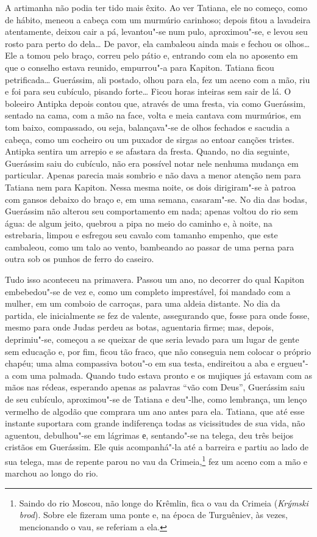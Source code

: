 A artimanha não podia ter tido mais êxito. Ao ver Tatiana, ele no
começo, como de hábito, meneou a cabeça com um murmúrio carinhoso;
depois fitou a lavadeira atentamente, deixou cair a pá, levantou"-se num
pulo, aproximou"-se, e levou seu rosto para perto do dela\ldots{} De pavor,
ela cambaleou ainda mais e fechou os olhos\ldots{} Ele a tomou pelo braço,
correu pelo pátio e, entrando com ela no aposento em que o conselho
estava reunido, empurrou"-a para Kapiton. Tatiana ficou petrificada\ldots{}
Guerássim, ali postado, olhou para ela, fez um aceno com a mão, riu e
foi para seu cubículo, pisando forte\ldots{} Ficou horas inteiras sem sair de
lá. O boleeiro Antipka depois contou que, através de uma fresta, via
como Guerássim, sentado na cama, com a mão na face, volta e meia cantava
com murmúrios, em tom baixo, compassado, ou seja, balançava"-se de olhos
fechados e sacudia a cabeça, como um cocheiro ou um puxador de sirgas ao
entoar canções tristes. Antipka sentira um arrepio e se afastara da
fresta. Quando, no dia seguinte, Guerássim saiu do cubículo, não era
possível notar nele nenhuma mudança em particular. Apenas parecia mais
sombrio e não dava a menor atenção nem para Tatiana nem para Kapiton.
Nessa mesma noite, os dois dirigiram"-se à patroa com gansos debaixo do
braço e, em uma semana, casaram"-se. No dia das bodas, Guerássim não
alterou seu comportamento em nada; apenas voltou do rio sem água: de
algum jeito, quebrou a pipa no meio do caminho e, à noite, na
estrebaria, limpou e esfregou seu cavalo com tamanho empenho, que este
cambaleou, como um talo ao vento, bambeando ao passar de uma perna para
outra sob os punhos de ferro do caseiro.

Tudo isso aconteceu na primavera. Passou um ano, no decorrer do qual
Kapiton embebedou"-se de vez e, como um completo imprestável, foi mandado
com a mulher, em um comboio de carroças, para uma aldeia distante. No
dia da partida, ele inicialmente se fez de valente, assegurando que,
fosse para onde fosse, mesmo para onde Judas perdeu as botas, aguentaria
firme; mas, depois, deprimiu"-se, começou a se queixar de que seria
levado para um lugar de gente sem educação e, por fim, ficou tão fraco,
que não conseguia nem colocar o próprio chapéu; uma alma compassiva
botou"-o em sua testa, endireitou a aba e ergueu"-a com uma palmada.
Quando tudo estava pronto e os mujiques já estavam com as mãos nas
rédeas, esperando apenas as palavras ``vão com Deus'', Guerássim saiu de
seu cubículo, aproximou"-se de Tatiana e deu"-lhe, como lembrança, um
lenço vermelho de algodão que comprara um ano antes para ela. Tatiana,
que até esse instante suportara com grande indiferença todas as
vicissitudes de sua vida, não aguentou, debulhou"-se em lágrimas е,
sentando"-se na telega, deu três beijos cristãos em Guerássim. Ele quis
acompanhá"-la até a barreira e partiu ao lado de sua telega, mas de
repente parou no vau da Crimeia,\footnote{Saindo do rio Moscou, não
  longe do Krêmlin, fica o vau da Crimeia (\emph{Krýmski brod}). Sobre
  ele fizeram uma ponte e, na época de Turguêniev, às vezes, mencionando
  o vau, se referiam a ela.} fez um aceno com a mão e marchou ao longo
do rio.

